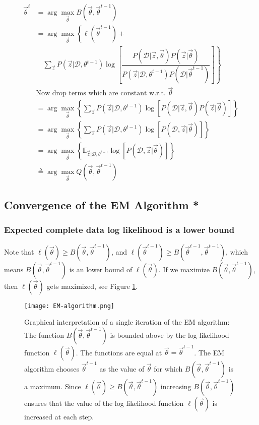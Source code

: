 \begin{align}
\vec{\theta}^t &= \arg\max\limits_{\vec{\theta}} B(\vec{\theta},\vec{\theta}^{t-1})  \nonumber \\
                &= \arg\max\limits_{\vec{\theta}}\left\{ \ell(\vec{\theta}^{t-1})+\right. \nonumber \\
				 & \quad \left. \sum\limits_{\vec{z}} P(\vec{z}|\mathcal{D},\theta^{t-1})\log\left[\dfrac{P(\mathcal{D}|\vec{z},\vec{\theta})P(\vec{z}|\vec{\theta})}{P(\vec{z}|\mathcal{D},\theta^{t-1})P(\mathcal{D}|\vec{\theta}^{t-1})}\right]\right\} \nonumber \\
				& \text{Now drop terms which are constant w.r.t. } \vec{\theta} \nonumber \\
				&= \arg\max\limits_{\vec{\theta}}{\left\{\sum\limits_{\vec{z}} P(\vec{z}|\mathcal{D},\theta^{t-1})\log\left[P(\mathcal{D}|\vec{z},\vec{\theta})P(\vec{z}|\vec{\theta})\right]\right\}} \nonumber \\
				&= \arg\max\limits_{\vec{\theta}}{\left\{\sum\limits_{\vec{z}} P(\vec{z}|\mathcal{D},\theta^{t-1})\log\left[P(\mathcal{D},\vec{z}|\vec{\theta})\right]\right\}} \nonumber \\
				&= \arg\max\limits_{\vec{\theta}}{\left\{\mathbb{E}_{\vec{z}|\mathcal{D},\theta^{t-1}}\log\left[P(\mathcal{D},\vec{z}|\vec{\theta})\right]\right\}} \\
				&\triangleq \arg\max\limits_{\vec{\theta}}{Q(\vec{\theta}, \vec{\theta}^{t-1})}
\end{align}


\subsection{Convergence of the EM Algorithm *}

\subsubsection{Expected complete data log likelihood is a lower bound}

Note that $\ell(\vec{\theta}) \geq B(\vec{\theta},\vec{\theta}^{t-1})$, and $\ell(\vec{\theta}^{t-1}) \geq B(\vec{\theta}^{t-1},\vec{\theta}^{t-1})$, which means $B(\vec{\theta},\vec{\theta}^{t-1})$ is an lower bound of $\ell(\vec{\theta})$. If we maximize $B(\vec{\theta},\vec{\theta}^{t-1})$, then $\ell(\vec{\theta})$ gets maximized, see Figure \ref{fig:EM-algorithm}.

\begin{figure}[hbtp]
\centering
    \texttt{[image: EM-algorithm.png]}
\caption{Graphical interpretation of a single iteration of the EM algorithm: The function $B(\vec{\theta},\vec{\theta}^{t-1})$ is bounded above by the log likelihood function $\ell(\vec{\theta})$. The functions are equal at $\vec{\theta} = \vec{\theta}^{t-1}$. The EM algorithm chooses $\vec{\theta}^{t-1}$ as the value of $\vec{\theta}$ for which $B(\vec{\theta},\vec{\theta}^{t-1})$ is a maximum. Since $\ell(\vec{\theta}) \geq B(\vec{\theta},\vec{\theta}^{t-1})$ increasing $B(\vec{\theta},\vec{\theta}^{t-1})$ ensures that the value of the log likelihood function $\ell(\vec{\theta})$ is increased at each step.}
\label{fig:EM-algorithm} 
\end{figure}

